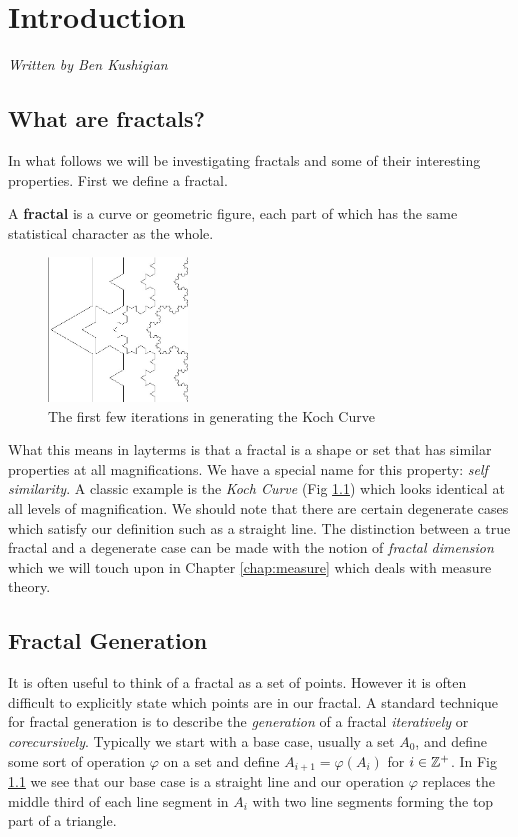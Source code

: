 \chapter{Introduction}
\label{chap:intro}
{\em Written by Ben Kushigian}
\section{What are fractals?}
In what follows we will be investigating fractals and some of their interesting
properties. First we define a fractal.

\begin{dfn}
  A {\bf fractal} is a curve or geometric figure, each part of
  which has the same statistical character as the whole.
\end{dfn}

\begin{figure}
  \centering
  \includegraphics[width=0.33\textwidth]{img/bk_introkochgen}
  \caption{The first few iterations in generating the Koch Curve}
  \label{fig:intro koch}
\end{figure}

What this means in layterms is that a fractal is a shape or set that has
similar properties at all magnifications. We have a special name for this
property: {\em self similarity}. A classic example is the
{\em Koch Curve} (Fig \ref{fig:intro koch}) which looks identical at all levels
of magnification. We should note that there are certain degenerate cases which
satisfy our definition such as a straight line. The distinction between a true
fractal and a degenerate case can be made with the notion of {\em fractal
dimension} which we will touch upon in Chapter \ref{chap:measure} which deals
with measure theory.\\

\section{Fractal Generation}
\label{sec:fractal generation}
It is often useful to think of a fractal as a set of points. However it is
often difficult to explicitly state which points are in our fractal. A standard
technique for fractal generation is to describe the {\em generation} of a 
fractal {\em iteratively} or {\em corecursively}. Typically we start with a
base case, usually a set \(A_0\), and define some sort of operation \(\varphi\)
on a set and define \(A_{i+1} = \varphi(A_i)\) for \(i \in \mathbb Z^+\). In
Fig \ref{fig:intro koch} we see that our base case is a straight line and our
operation \(\varphi\) replaces the middle third of each line segment in \(A_i\)
with two line segments forming the top part of a triangle.\\

